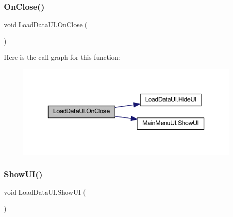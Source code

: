 \subsubsection{\texorpdfstring{OnClose()}{OnClose()}}
{\footnotesize\ttfamily void Load\+Data\+U\+I.\+On\+Close (\begin{DoxyParamCaption}{ }\end{DoxyParamCaption})}

Here is the call graph for this function\+:\nopagebreak
\begin{figure}[H]
\begin{center}
\leavevmode
\includegraphics[width=330pt]{class_load_data_u_i_a5d74ebc8dc0756974c13087df72872f0_cgraph}
\end{center}
\end{figure}
\mbox{\label{class_load_data_u_i_ac0ab99a18f93b2092d30e1ecea86154d}} 
\subsubsection{\texorpdfstring{ShowUI()}{ShowUI()}}
{\footnotesize\ttfamily void Load\+Data\+U\+I.\+Show\+UI (\begin{DoxyParamCaption}{ }\end{DoxyParamCaption})}

